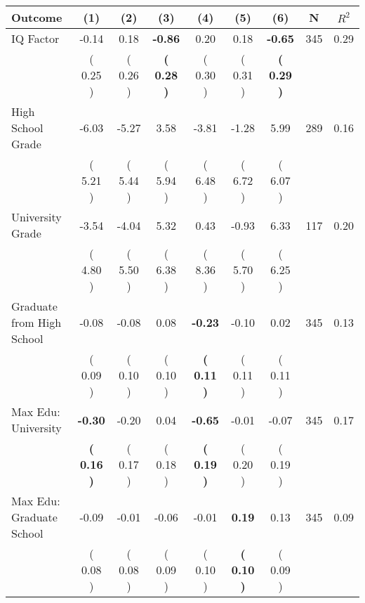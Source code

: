 \begin{tabular}{lcccccccc}
\toprule
 \textbf{Outcome} & \textbf{(1)} & \textbf{(2)} & \textbf{(3)} & \textbf{(4)} & \textbf{(5)} & \textbf{(6)} & \textbf{N} & \textbf{$ R^2$} \\
\midrule
IQ Factor &     -0.14 &      0.18 & \textbf{    -0.86} &      0.20 &      0.18 & \textbf{    -0.65} & 345 &       0.29 \\ 
 & (     0.25 ) & (     0.26 ) & \textbf{(     0.28 )} & (     0.30 ) & (     0.31 ) & \textbf{(     0.29 )} & \\
High School Grade &     -6.03 &     -5.27 &      3.58 &     -3.81 &     -1.28 &      5.99 & 289 &       0.16 \\ 
 & (     5.21 ) & (     5.44 ) & (     5.94 ) & (     6.48 ) & (     6.72 ) & (     6.07 ) & \\
University Grade &     -3.54 &     -4.04 &      5.32 &      0.43 &     -0.93 &      6.33 & 117 &       0.20 \\ 
 & (     4.80 ) & (     5.50 ) & (     6.38 ) & (     8.36 ) & (     5.70 ) & (     6.25 ) & \\
Graduate from High School &     -0.08 &     -0.08 &      0.08 & \textbf{    -0.23} &     -0.10 &      0.02 & 345 &       0.13 \\ 
 & (     0.09 ) & (     0.10 ) & (     0.10 ) & \textbf{(     0.11 )} & (     0.11 ) & (     0.11 ) & \\
Max Edu: University & \textbf{    -0.30} &     -0.20 &      0.04 & \textbf{    -0.65} &     -0.01 &     -0.07 & 345 &       0.17 \\ 
 & \textbf{(     0.16 )} & (     0.17 ) & (     0.18 ) & \textbf{(     0.19 )} & (     0.20 ) & (     0.19 ) & \\
Max Edu: Graduate School &     -0.09 &     -0.01 &     -0.06 &     -0.01 & \textbf{     0.19} &      0.13 & 345 &       0.09 \\ 
 & (     0.08 ) & (     0.08 ) & (     0.09 ) & (     0.10 ) & \textbf{(     0.10 )} & (     0.09 ) & \\
\bottomrule
\end{tabular}
